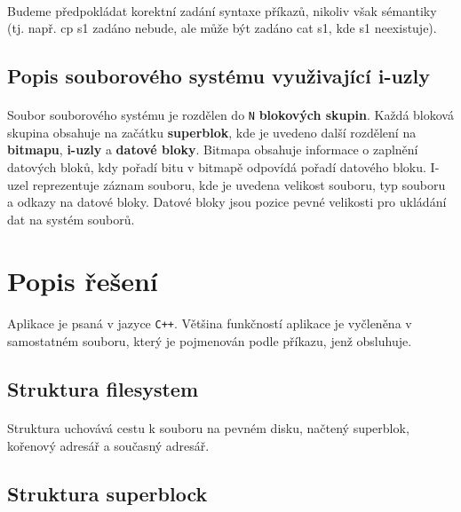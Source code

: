 \documentclass[12pt]{scrartcl}
\begin{document}
\paragraph{}
Budeme předpokládat korektní zadání syntaxe příkazů, nikoliv však sémantiky (tj. např. cp s1 zadáno nebude, ale může být zadáno cat s1, kde s1 neexistuje).

\subsection{Popis souborového systému využivající i-uzly}
\paragraph{}
Soubor souborového systému je rozdělen do \texttt{N} \textbf{blokových skupin}. Každá bloková skupina obsahuje na začátku \textbf{superblok}, kde je uvedeno další rozdělení na \textbf{bitmapu}, \textbf{i-uzly} a \textbf{datové bloky}. Bitmapa obsahuje informace o zaplnění datových bloků, kdy pořadí bitu v bitmapě odpovídá pořadí datového bloku. I-uzel reprezentuje záznam souboru, kde je uvedena velikost souboru, typ souboru a odkazy na datové bloky. Datové bloky jsou pozice pevné velikosti pro ukládání dat na systém souborů.

\newpage
\section{Popis řešení}
\paragraph{}
Aplikace je psaná v jazyce \texttt{C++}. Většina funkčností aplikace je vyčleněna v samostatném souboru, který je pojmenován podle příkazu, jenž obsluhuje.

\subsection{Struktura filesystem}
\paragraph{}
Struktura uchovává cestu k souboru na pevném disku, načtený superblok, kořenový adresář a současný adresář.

\subsection{Struktura superblock}
\end{document}
